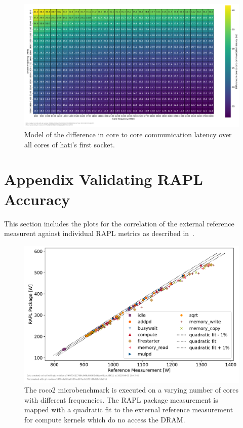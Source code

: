\begin{figure}[]
    \centering
    \includegraphics[width=\columnwidth]{fig/core-to-core-latency/all-to-all-heatmap-model-diff.pdf}
    \caption{Model of the difference in core to core communication latency over all cores of hati's first socket.}
\end{figure}


\chapter{Appendix Validating RAPL Accuracy}
\label{app:validating_rapl_accuracy}
This section includes the plots for the correlation of the external reference measurent against individual RAPL metrics as described in~.

\begin{figure}[]
    \centering
    \includegraphics[width=0.8\columnwidth]{fig/rapl-accuracy/rapl-accuracy-package.pdf}
    \caption{The roco2 microbenchmark is executed on a varying number of cores with different frequencies.
    The RAPL package measurement is mapped with a quadratic fit to the external reference measurement for compute kernels which do no access the DRAM.}
\end{figure}


